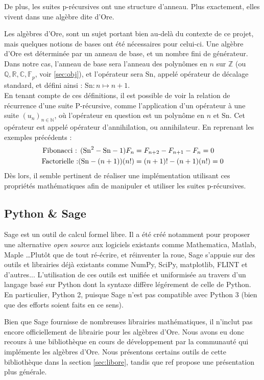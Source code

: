 \documentclass[12pt]{article}
\newcommand{\Sn}{\mathrm{Sn}}
\begin{document}
        De plus, les suites p-récursives ont une structure d'anneau. Plus exactement,
        elles vivent dans une algèbre dite d'Ore.\\
        \par Les algèbres d'Ore, sont un sujet
        portant bien au-delà du contexte de ce projet, mais quelques notions de bases
        ont été nécessaires pour celui-ci. Une algèbre d'Ore est déterminée par un
        anneau de base, et un nombre fini de générateur. Dans notre cas, l'anneau de base
        sera l'anneau des polynômes en $n$ sur $\mathbb Z$ (ou $\mathbb {Q,R,C,F}_p$, voir
        \ref{sec:obj}), et l'opérateur sera $\Sn$, appelé opérateur de décalage standard, et
        défini ainsi : $\Sn : n\mapsto n+1$.\\
        En tenant compte de ces définitions,
        il est possible de voir la relation de récurrence d'une suite P-récursive,
        comme l'application d'un opérateur à une suite $(u_n)_{n\in\mathbb N}$,
        où l'opérateur en question est un polynôme en $n$ et $\Sn$. Cet opérateur
        est appelé opérateur d'annihilation, ou annihilateur. En reprenant les exemples
        précédents :
        \begin{align*}
            \textnormal{Fibonacci : } (\Sn^2 - \Sn - 1)F_n &= F_{n+2} - F_{n+1} - F_n = 0\\
            \textnormal{Factorielle :} (\Sn - (n+1))(n!) &= (n+1)! - (n+1)(n!) = 0\\
        \end{align*}
        Dès lors, il semble pertinent
        de réaliser une implémentation utilisant ces propriétés mathématiques afin de
        manipuler et utiliser les suites p-récursives.\\
    \subsection{Python \& Sage}
        \label{sec:sage}
        \par Sage est un outil de calcul formel libre.
        Il a été créé notamment pour proposer
        une alternative \textit{open source} aux logiciels existants comme Mathematica,
        Matlab, Maple \ldots Plutôt que de tout ré-écrire, et réinventer la roue,
        Sage s'appuie sur des outils
        et librairies déjà existants comme NumPy, SciPy, matplotlib, FLINT et d'autres...
        L'utilisation de ces outils est unifiée et uniformisée au travers d'un langage
        basé sur Python dont la syntaxe diffère légérement de celle
        de Python. En particulier, Python 2, puisque Sage n'est pas compatible avec Python 3
        (bien que des efforts soient faits en ce sens).
        \par Bien que Sage fournisse de nombreuses librairies mathématiques,
        il n'inclut pas encore officiellement de librairie pour les algèbres d'Ore.
        Nous avons eu donc recours à une bibliothèque en cours de développement par
        la communauté qui implémente les algèbres d'Ore. Nous présentons certains outils
        de cette bibliothèque
        dans la section \ref{sec:libore}, tandis que {\color{red} ref} propose une
        présentation plus générale.
\end{document}
